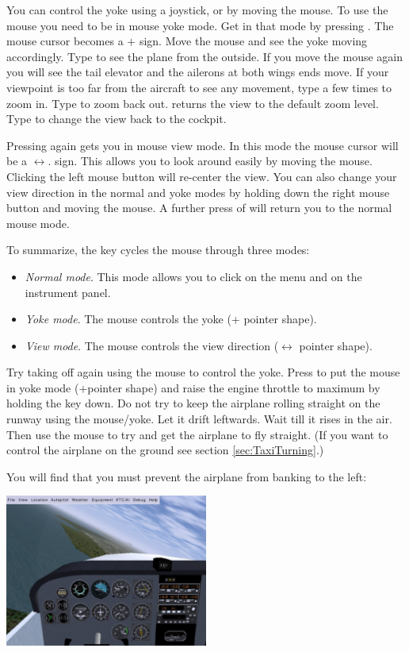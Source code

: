 \begin{itemize}
You can control the yoke using a joystick, or by moving the mouse. To use the
mouse you need to be in mouse yoke mode. Get in that mode by pressing .
The mouse cursor becomes a $+$ sign. Move the mouse and see the
yoke moving accordingly. Type  to see the plane from the outside. If you
move the mouse again you will see the tail elevator and the ailerons at both
wings ends move. If your viewpoint is too far from the aircraft to see any
movement, type  a few times to zoom in.
Type  to zoom back out.  returns the view to the default zoom
level. Type  to change the view back to the cockpit.

Pressing  again gets you in mouse view mode. In this mode the mouse cursor will
be a $\leftrightarrow$. sign. This allows you to look around easily by moving
the mouse. Clicking the left mouse button will re-center the view.  You can also
change your view direction in the normal and yoke modes by holding down the right
mouse button and moving the mouse. A further press of  will return you to the
normal mouse mode.

To summarize, the  key cycles the mouse through three modes:
\begin{itemize}
    \item \textit{Normal mode}. This mode allows you to
  click on the menu and on the instrument panel.
    \item \textit{Yoke mode}.
  The mouse controls the yoke (+ pointer shape).
    \item \textit{View mode}. The mouse controls the
  view direction ($\leftrightarrow$ pointer shape).
\end{itemize}

Try taking off again using the mouse to control the yoke. Press  to put
the mouse in yoke mode ($+$pointer shape) and raise the engine throttle to
maximum by holding the  key down. Do not try to keep the airplane
rolling straight on the runway using the mouse/yoke. Let it drift leftwards.
Wait till it rises in the air. Then use the mouse to try and get the
airplane to fly straight. (If you want to control the airplane on the
ground see section \ref{sec:TaxiTurning}.)

You will find that you must prevent the airplane from banking to the left:

\begin{center}
\includegraphics[width=0.5\textwidth]{img/tut_11}
\end{center}


\end{itemize}

